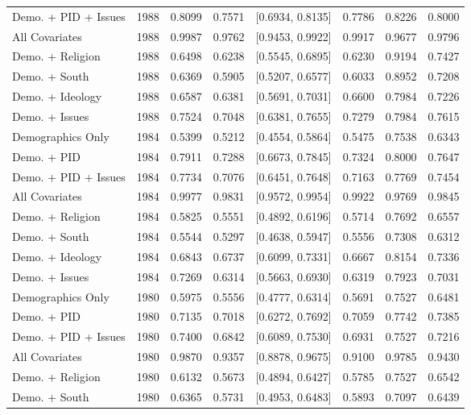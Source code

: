\begin{longtable}{lrrrlrrr}
  Demo. + PID + Issues & 1988 & 0.8099 & 0.7571 & [0.6934, 0.8135] & 0.7786 & 0.8226 & 0.8000 \\ 
  All Covariates & 1988 & 0.9987 & 0.9762 & [0.9453, 0.9922] & 0.9917 & 0.9677 & 0.9796 \\ 
  Demo. + Religion & 1988 & 0.6498 & 0.6238 & [0.5545, 0.6895] & 0.6230 & 0.9194 & 0.7427 \\ 
  Demo. + South & 1988 & 0.6369 & 0.5905 & [0.5207, 0.6577] & 0.6033 & 0.8952 & 0.7208 \\ 
  Demo. + Ideology & 1988 & 0.6587 & 0.6381 & [0.5691, 0.7031] & 0.6600 & 0.7984 & 0.7226 \\ 
  Demo. + Issues & 1988 & 0.7524 & 0.7048 & [0.6381, 0.7655] & 0.7279 & 0.7984 & 0.7615 \\ 
  Demographics Only & 1984 & 0.5399 & 0.5212 & [0.4554, 0.5864] & 0.5475 & 0.7538 & 0.6343 \\ 
  Demo. + PID & 1984 & 0.7911 & 0.7288 & [0.6673, 0.7845] & 0.7324 & 0.8000 & 0.7647 \\ 
  Demo. + PID + Issues & 1984 & 0.7734 & 0.7076 & [0.6451, 0.7648] & 0.7163 & 0.7769 & 0.7454 \\ 
  All Covariates & 1984 & 0.9977 & 0.9831 & [0.9572, 0.9954] & 0.9922 & 0.9769 & 0.9845 \\ 
  Demo. + Religion & 1984 & 0.5825 & 0.5551 & [0.4892, 0.6196] & 0.5714 & 0.7692 & 0.6557 \\ 
  Demo. + South & 1984 & 0.5544 & 0.5297 & [0.4638, 0.5947] & 0.5556 & 0.7308 & 0.6312 \\ 
  Demo. + Ideology & 1984 & 0.6843 & 0.6737 & [0.6099, 0.7331] & 0.6667 & 0.8154 & 0.7336 \\ 
  Demo. + Issues & 1984 & 0.7269 & 0.6314 & [0.5663, 0.6930] & 0.6319 & 0.7923 & 0.7031 \\ 
  Demographics Only & 1980 & 0.5975 & 0.5556 & [0.4777, 0.6314] & 0.5691 & 0.7527 & 0.6481 \\ 
  Demo. + PID & 1980 & 0.7135 & 0.7018 & [0.6272, 0.7692] & 0.7059 & 0.7742 & 0.7385 \\ 
  Demo. + PID + Issues & 1980 & 0.7400 & 0.6842 & [0.6089, 0.7530] & 0.6931 & 0.7527 & 0.7216 \\ 
  All Covariates & 1980 & 0.9870 & 0.9357 & [0.8878, 0.9675] & 0.9100 & 0.9785 & 0.9430 \\ 
  Demo. + Religion & 1980 & 0.6132 & 0.5673 & [0.4894, 0.6427] & 0.5785 & 0.7527 & 0.6542 \\ 
  Demo. + South & 1980 & 0.6365 & 0.5731 & [0.4953, 0.6483] & 0.5893 & 0.7097 & 0.6439 \\ 

\end{longtable}
